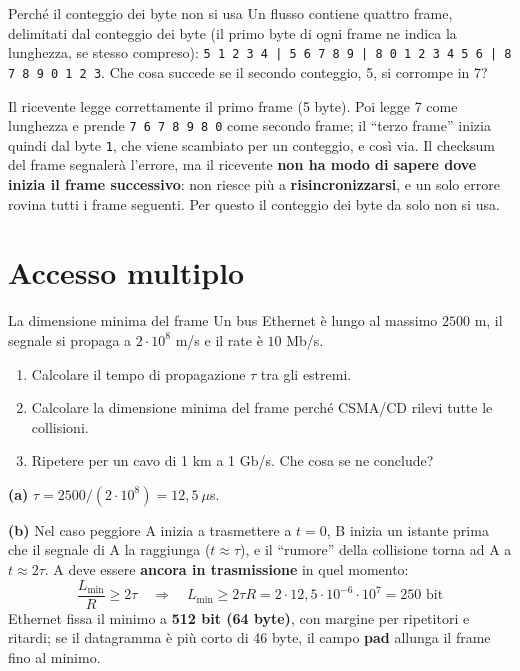 \begin{esercizio}{Perché il conteggio dei byte non si usa}
Un flusso contiene quattro frame, delimitati dal conteggio dei byte (il primo byte di ogni frame ne indica la lunghezza, se stesso
compreso): \texttt{5 1 2 3 4 | 5 6 7 8 9 | 8 0 1 2 3 4 5 6 | 8 7 8 9 0 1 2 3}. Che cosa succede se il secondo conteggio, 5, si
corrompe in 7?
\end{esercizio}

\svolgimento
Il ricevente legge correttamente il primo frame (5 byte). Poi legge 7 come lunghezza e prende \texttt{7 6 7 8 9 8 0} come secondo
frame; il ``terzo frame'' inizia quindi dal byte \texttt{1}, che viene scambiato per un conteggio, e così via. Il checksum del frame
segnalerà l'errore, ma il ricevente \textbf{non ha modo di sapere dove inizia il frame successivo}: non riesce più a
\textbf{risincronizzarsi}, e un solo errore rovina tutti i frame seguenti. Per questo il conteggio dei byte da solo non si usa.

\section{Accesso multiplo}

\begin{esercizio}{La dimensione minima del frame}
Un bus Ethernet è lungo al massimo $2500$ m, il segnale si propaga a $2 \cdot 10^8$ m/s e il rate è $10$ Mb/s.
\begin{enumerate}[label=(\alph*)]
    \item Calcolare il tempo di propagazione $\tau$ tra gli estremi.
    \item Calcolare la dimensione minima del frame perché CSMA/CD rilevi tutte le collisioni.
    \item Ripetere per un cavo di 1 km a 1 Gb/s. Che cosa se ne conclude?
\end{enumerate}
\end{esercizio}

\svolgimento
\textbf{(a)} $\tau = 2500 / (2\cdot 10^8) = 12{,}5\ \mu$s.

\textbf{(b)} Nel caso peggiore A inizia a trasmettere a $t = 0$, B inizia un istante prima che il segnale di A la raggiunga ($t \approx \tau$),
e il ``rumore'' della collisione torna ad A a $t \approx 2\tau$. A deve essere \textbf{ancora in trasmissione} in quel momento:
$$\frac{L_{\min}}{R} \ge 2\tau \quad\Rightarrow\quad L_{\min} \ge 2\tau R = 2 \cdot 12{,}5\cdot 10^{-6} \cdot 10^7 = 250 \text{ bit}$$
Ethernet fissa il minimo a \textbf{512 bit (64 byte)}, con margine per ripetitori e ritardi; se il datagramma è più corto di 46 byte,
il campo \textbf{pad} allunga il frame fino al minimo.

